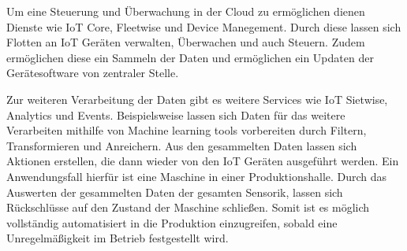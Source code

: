 Um eine Steuerung und Überwachung in der Cloud zu ermöglichen dienen Dienste wie IoT Core, Fleetwise und Device Manegement. Durch diese lassen sich Flotten an IoT Geräten verwalten, Überwachen und auch Steuern. Zudem ermöglichen diese ein Sammeln der Daten und ermöglichen ein Updaten der Gerätesoftware von zentraler Stelle.\cite*[]{ÜAWS}

Zur weiteren Verarbeitung der Daten gibt es weitere Services wie IoT Sietwise, Analytics und Events. Beispielsweise lassen sich Daten für das weitere Verarbeiten mithilfe von Machine learning tools vorbereiten durch Filtern, Transformieren und Anreichern. Aus den gesammelten Daten lassen sich Aktionen erstellen, die dann wieder von den IoT Geräten ausgeführt werden. Ein Anwendungsfall hierfür ist eine Maschine in einer Produktionshalle. Durch das Auswerten der gesammelten Daten der gesamten Sensorik, lassen sich Rückschlüsse auf den Zustand der Maschine schließen. Somit ist es möglich vollständig automatisiert in die Produktion einzugreifen, sobald eine Unregelmäßigkeit im Betrieb festgestellt wird.\cite*[]{ÜAWS}